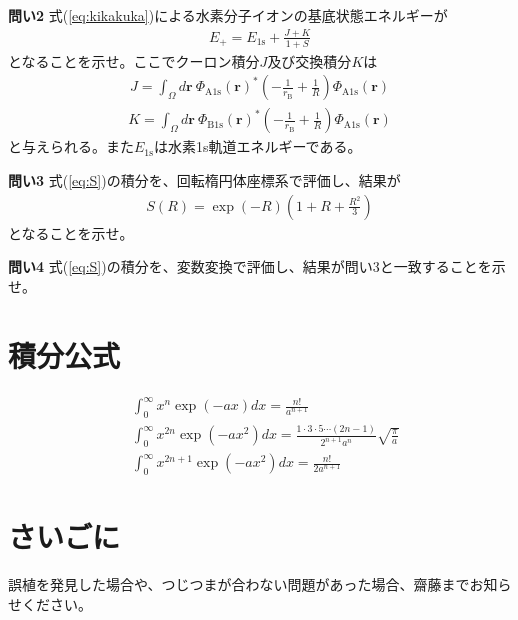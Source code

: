 \documentclass[11pt,pra,aps]{revtex4}
\begin{document}
\noindent
{\bf 問い2} 式(\ref{eq:kikakuka})による水素分子イオンの基底状態エネルギーが
\begin{align}
  E_+=E_\text{1s}+\frac{J+K}{1+S}
\end{align}    
となることを示せ。ここでクーロン積分$J$及び交換積分$K$は
\begin{align}
  J=\int_\Omega d\mathbf{r} \ \Phi_\text{A1s}(\mathbf{r})^{*} \left(-\frac{1}{r_\text{B}}+\frac{1}{R}\right) \Phi_\text{A1s}(\mathbf{r})
\end{align}
\begin{align}
  K=\int_\Omega d\mathbf{r} \ \Phi_\text{B1s}(\mathbf{r})^{*} \left(-\frac{1}{r_\text{B}}+\frac{1}{R}\right) \Phi_\text{A1s}(\mathbf{r})
\end{align}
と与えられる。また$E_\text{1s}$は水素1s軌道エネルギーである。

\noindent
{\bf 問い3} 式(\ref{eq:S})の積分を、回転楕円体座標系で評価し、結果が
\begin{align}
  S(R)=\exp(-R)\left(1+R+\frac{R^2}{3}\right)
\end{align}
となることを示せ。

\noindent
{\bf 問い4} 式(\ref{eq:S})の積分を、変数変換で評価し、結果が問い3と一致することを示せ。


\section{積分公式}
\begin{align}
  &\int_0^\infty x^n \exp(-ax) dx = \frac{n!}{a^{n+1}} \\
  &\int_0^\infty x^{2n} \exp(-ax^2) dx = \frac{1\cdot3\cdot5\cdots(2n-1)}{2^{n+1}a^n}\sqrt{\frac{\pi}{a}} \\
  &\int_0^\infty x^{2n+1} \exp(-ax^2) dx = \frac{n!}{2 a^{n+1}}
\end{align}

\section{さいごに}

誤植を発見した場合や、つじつまが合わない問題があった場合、齋藤までお知らせください。
\end{document}
